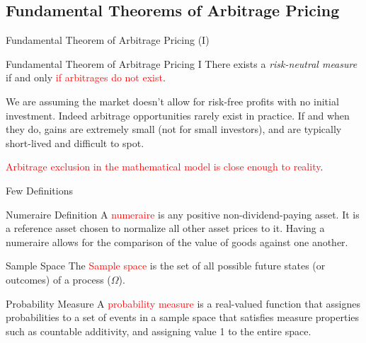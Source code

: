 \documentclass{beamer}
\begin{document}
\subsection{Fundamental Theorems of Arbitrage Pricing}
\begin{frame}{Fundamental Theorem of Arbitrage Pricing (I)}
	\begin{block}{Fundamental Theorem of Arbitrage Pricing I}
		There exists a \emph{risk-neutral measure} if and only \textcolor{red}{if arbitrages do not exist}.
	\end{block}
	\vspace{1cm}
    We are assuming the market doesn't allow for risk-free profits with no initial investment.
    Indeed arbitrage opportunities rarely exist in practice. If and when they do, gains are extremely small (not for small investors), and are typically short-lived and difficult to spot. 
    
	\textcolor{red}{Arbitrage exclusion in the mathematical model is close enough to reality}.
\end{frame}

\begin{frame}{Few Definitions}
	\begin{block}{Numeraire Definition}
		A \textcolor{red}{numeraire} is any positive non-dividend-paying asset. It is a reference asset chosen to normalize all other asset prices to it. Having a numeraire allows for the comparison of the value of goods against one another.
	\end{block}

    \begin{block}{Sample Space}
        The \textcolor{red}{Sample space} is the set of all possible future states (or outcomes) of a process ($\Omega$).
    \end{block}
    
    \begin{block}{Probability Measure}
		A \textcolor{red}{probability measure} is a real-valued function that assignes probabilities to a set of events in a sample space that satisfies measure properties such as countable additivity, and assigning value 1 to the entire space.
	\end{block}	
\end{frame}
\end{document}
